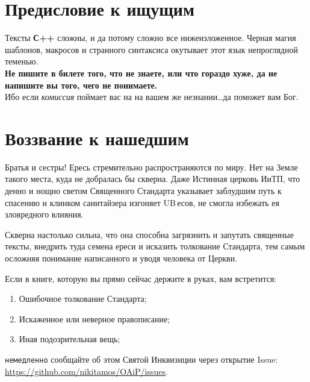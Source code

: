 \section*{Предисловие к ищущим}
\large{Тексты \textbf{С++} сложны, и да потому сложно все нижеизложенное.
Черная магия шаблонов, макросов и странного синтаксиса окутывает этот язык непроглядной теменью.}\\

\Large{\textbf{Не пишите в билете того, что не знаете, или что гораздо хуже, да не напишите вы того, чего не понимаете.}}\\

\large{Ибо если \textit{комиссия} поймает вас на на вашем же незнании\dots да поможет вам Бог.}

\section*{Воззвание к нашедшим}
Братья и сестры! Ересь стремительно распространяются по миру. Нет
на Земле такого места, куда не добралась бы скверна. Даже Истинная
церковь ИиТП, что денно и нощно светом Священного Стандарта указывает заблудшим
путь к спасению и клинком санитайзера изгоняет UB\,есов, не смогла избежать
ея зловредного влияния.

Скверна настолько сильна, что она способна загрязнить и запутать священные тексты,
внедрить туда семена ереси и исказить толкование Стандарта, тем самым осложняя
понимание написанного и уводя человека от Церкви. 

Если в книге, которую вы прямо сейчас держите в руках, вам встретится:
\begin{enumerate}
  \item Ошибочное толкование Стандарта;
  \item Искаженное или неверное правописание;
  \item Иная подозрительная вещь;
\end{enumerate}
\texttt{немедленно} сообщайте об этом Святой Инквизиции через открытие Issue:
\url{https://github.com/nikitamos/OAiP/issues}.